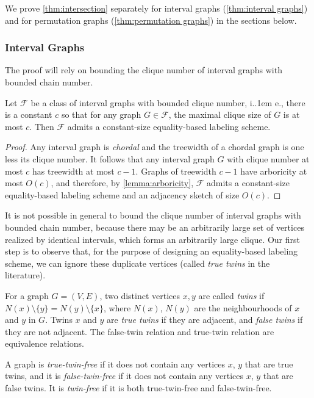 \documentclass{article}
\makeatletter
\newcommand{\cF}{\ensuremath{\mathcal{F}}}
\newcommand*\ie{i.\kern.1em e.\@\xspace} %
\makeatother
\begin{document}
We prove \cref{thm:intersection} separately for interval graphs (\cref{thm:interval graphs})
and for permutation graphs (\cref{thm:permutation graphs}) in the sections below.

\subsubsection{Interval Graphs}

The proof will rely on bounding the clique number of interval graphs with bounded chain number.

\begin{lemma}
\label{lem:bounded-clique-number-implies-RL-const}
Let $\cF$ be a class of interval graphs with bounded clique number, \ie, there is a
constant $c$ so that for any graph $G\in\cF$, the maximal clique size of $G$ is at most $c$.  Then $\cF$
admits a constant-size equality-based labeling scheme.
\end{lemma}
\begin{proof}
Any interval graph is \emph{chordal} and the treewidth of a chordal graph is one less its clique
number.  It follows that any interval graph $G$ with clique number at most $c$ has treewidth at most
$c-1$.  Graphs of treewidth $c-1$ have arboricity at most $O(c)$, and therefore, by
\cref{lemma:arboricity}, $\cF$ admits a constant-size equality-based labeling scheme and an
adjacency sketch of size $O(c)$.
\end{proof}

It is not possible in general to bound the clique number of interval graphs with bounded chain
number, because there may be an arbitrarily large set of vertices realized by identical intervals,
which forms an arbitrarily large clique. Our first step is to observe that, for the purpose of
designing an equality-based labeling scheme, we can ignore these duplicate vertices (called
\emph{true twins} in the literature).

\begin{definition}
For a graph $G = (V,E)$, two distinct vertices $x,y$ are called \emph{twins} if $N(x) \setminus
\{y\} = N(y) \setminus \{x\}$, where $N(x)$, $N(y)$ are the neighbourhoods of $x$ and $y$ in $G$.
Twins $x$ and $y$ are \emph{true twins} if they are adjacent, and \emph{false twins} if they are not
adjacent. The false-twin relation and true-twin relation are equivalence relations.

A graph is \emph{true-twin-free} if it does not contain any vertices $x$, $y$ that are true twins, and
it is \emph{false-twin-free} if it does not contain any vertices $x$, $y$ that are false twins. It
is \emph{twin-free} if it is both true-twin-free and false-twin-free.
\end{definition}
\end{document}

